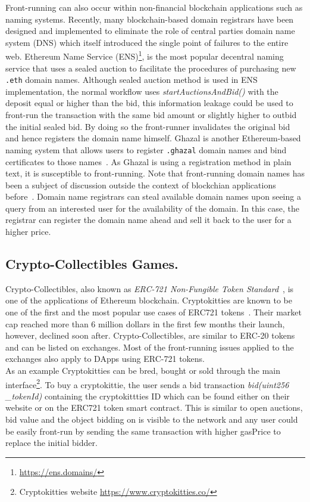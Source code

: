 Front-running can also occur within non-financial blockchain applications such as naming systems. Recently, many blockchain-based domain registrars have been designed and implemented to eliminate the role of central parties \ie domain name system (DNS) which itself introduced the single point of failures to the entire web. Ethereum Name Service (ENS)\footnote{\url{https://ens.domains/}}, is the most popular decentral naming service that uses a sealed auction to facilitate the procedures of purchasing new \texttt{.eth} domain names. Although sealed auction method is used in ENS implementation, the normal workflow uses \textit{startAuctionsAndBid()} with the deposit equal or higher than the bid, this information leakage could be used to front-run the transaction with the same bid amount or slightly higher to outbid the initial sealed bid. By doing so the front-runner invalidates the original bid and hence registers the domain name himself. Ghazal is another Ethereum-based naming system that allows users to register \texttt{.ghazal} domain names and bind certificates to those names~\cite{moosavighazal}.  As Ghazal is using a registration method in plain text, it is susceptible to front-running. 
Note that front-running domain names has been a subject of discussion outside the context of blockchian applications before~\cite{sac022en33:online}. Domain name registrars can steal available domain names upon seeing a query from an interested user for the availability of the domain. In this case, the registrar can register the domain name ahead and sell it back to the user for a higher price.
\subsection{Crypto-Collectibles Games.}

Crypto-Collectibles, also known as \textit{ERC-721 Non-Fungible Token Standard}~\cite{erc721}, is one of the applications of Ethereum blockchain. Cryptokitties are known to be one of the first and the most popular use cases of ERC721 tokens~\cite{cryptokitties}. Their market cap reached more than 6 million dollars in the first few months their launch, however, declined soon after. Crypto-Collectibles, are similar to ERC-20 tokens and can be listed on exchanges. Most of the front-running issues applied to the exchanges also apply to DApps using ERC-721 tokens. \\

As an example Cryptokitties can be bred, bought or sold through the main interface\footnote{Cryptokitties website \url{https://www.cryptokitties.co/}}. %
To buy a cryptokittie, the user sends a bid transaction \textit{bid(uint256 \_tokenId)} containing the cryptokittties ID which can be found either on their website or on the ERC721 token smart contract. This is similar to open auctions, bid value and the object bidding on is visible to the network and any user could be easily front-run by sending the same transaction with higher gasPrice to replace the initial bidder. 

